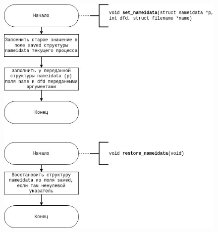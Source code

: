 \documentclass[12pt]{report}
\begin{document}
\begin{figure}[H]
	\centering
	\includegraphics[scale=0.9]{img/nameidata.jpg}
	\label{fig:nameidata}
\end{figure}

	
\end{document}
